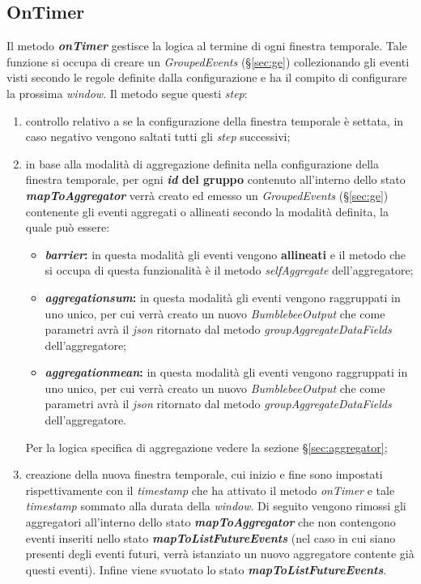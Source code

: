 \subsection{OnTimer}\label{sec:on-timer-windowing}
Il metodo \textbf{\textit{onTimer}} gestisce la logica al termine di ogni finestra temporale. Tale funzione si occupa di creare un \textit{GroupedEvents} (\S\ref{sec:ge}) collezionando gli eventi visti secondo le regole definite dalla configurazione e ha il compito di configurare la prossima \textit{window}. Il metodo segue questi \textit{step}:
\begin{enumerate}
	\item{controllo relativo a se la configurazione della finestra temporale è settata, in caso negativo vengono saltati tutti gli \textit{step} successivi;}
	\item{in base alla modalità di aggregazione definita nella configurazione della finestra temporale, per ogni \textbf{\textit{id} del gruppo} contenuto all'interno dello stato \textbf{\textit{mapToAggregator}} verrà creato ed emesso un \textit{GroupedEvents} (\S\ref{sec:ge}) contenente gli eventi aggregati o allineati secondo la modalità definita, la quale può essere:
	\begin{itemize}
		\item{\textbf{\textit{barrier}:} in questa modalità gli eventi vengono \textbf{allineati} e il metodo che si occupa di questa funzionalità è il metodo \textit{selfAggregate} dell'aggregatore;}
		\item{\textbf{\textit{aggregation\textunderscore sum}:} in questa modalità gli eventi vengono raggruppati in uno unico, per cui verrà creato un nuovo \textit{BumblebeeOutput} che come parametri avrà il \textit{\gls{json}} ritornato dal metodo \textit{groupAggregateDataFields} dell'aggregatore;}
		\item{\textbf{\textit{aggregation\textunderscore mean}:} in questa modalità gli eventi vengono raggruppati in uno unico, per cui verrà creato un nuovo \textit{BumblebeeOutput} che come parametri avrà il \textit{\gls{json}} ritornato dal metodo \textit{groupAggregateDataFields} dell'aggregatore.}
	\end{itemize}
	Per la logica specifica di aggregazione vedere la sezione \S\ref{sec:aggregator};}
	\item{creazione della nuova finestra temporale, cui inizio e fine sono impostati rispettivamente con il \textit{\gls{timestamp}} che ha attivato il metodo \textit{onTimer} e tale \textit{\gls{timestamp}} sommato alla durata della \textit{window}. Di seguito vengono rimossi gli aggregatori all'interno dello stato \textbf{\textit{mapToAggregator}} che non contengono eventi inseriti nello stato \textbf{\textit{mapToListFutureEvents}} (nel caso in cui siano presenti degli eventi futuri, verrà istanziato un nuovo aggregatore contente già questi eventi). Infine viene svuotato lo stato \textbf{\textit{mapToListFutureEvents}}.
	}
\end{enumerate}





